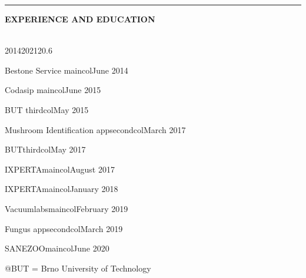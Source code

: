 \documentclass[10pt,A4]{article}
\newcommand{\cvsection}[2] {
\textcolor{sectcol}{\uppercase{\textbf{#1}}}
}
\newcommand{\cvsect}[4]{
	\textcolor{#3}{\hrule}
	\colorbox{#3}{ {\cvsection{#1}{#4}}}
}
\begin{document}
\begin{minipage}{0.4\textwidth}
\vspace{56pt}
\cvsect{Experience and Education}{0.4}{thirdcol}{textcol}\\[16pt]

\hspace{60pt}\mbox{  }
\vspace{-50pt}
\begin{center}

\begin{cvtimeline}{2014}{2021}{20.6}%



    {Bestone Service}
    {maincol}{June 2014}

    {Codasip}
    {maincol}{June 2015}

    {BUT}
    {thirdcol}{May 2015}

    {Mushroom Identification app}{secondcol}{March 2017}

    {BUT}{thirdcol}{May 2017}

    {IXPERTA}{maincol}{August 2017}

    {IXPERTA}{maincol}{January 2018}
    
    {Vacuumlabs}{maincol}{February 2019}    

    {Fungus app}{secondcol}{March 2019}

    {SANEZOO}{maincol}{June 2020}
     
\end{cvtimeline}
\tiny @BUT = Brno University of Technology
\end{center}
\end{minipage}

\newpage
\newcommand{\cvsecta}[1]{%
	\vspace{\baselineskip} %
	\colorbox{thirdcol}{\textcolor{white}{\MakeUppercase{\textbf{#1}}}}\\%
}
\end{document}
